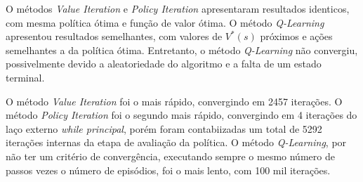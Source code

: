 O métodos \textit{Value Iteration} e \textit{Policy Iteration} apresentaram resultados identicos, com mesma política ótima e função de valor ótima. O método \textit{Q-Learning} apresentou resultados semelhantes, com valores de \( V^* (s) \) próximos e ações semelhantes a da política ótima. Entretanto, o método \textit{Q-Learning} não convergiu, possivelmente devido a aleatoriedade do algoritmo e a falta de um estado terminal.

O método \textit{Value Iteration} foi o mais rápido, convergindo em 2457 iterações. O método \textit{Policy Iteration} foi o segundo mais rápido, convergindo em 4 iterações do laço externo \textit{while principal}, porém foram contabiizadas um total de 5292 iterações internas da etapa de avaliação da política. O método \textit{Q-Learning}, por não ter um critério de convergência, executando sempre o mesmo número de passos vezes o número de episódios, foi o mais lento, com 100 mil iterações.


